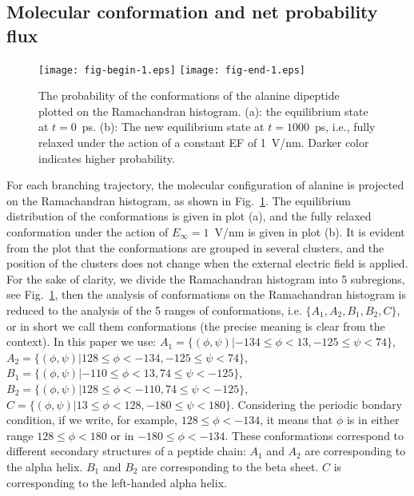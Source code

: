 \documentclass[a4paper,preprint,unsortedaddress,onecolumn]{revtex4-1}
\begin{document}
\subsection{Molecular conformation and net probability flux}

\begin{figure}
  \centering
  \texttt{[image: fig-begin-1.eps]}
  \texttt{[image: fig-end-1.eps]}
  \caption{The probability of the conformations of the alanine dipeptide plotted on the Ramachandran histogram.
    (a): the
    equilibrium state at $t=0$~\textsf{ps}. (b): The new equilibrium
    state at $t=1000$~\textsf{ps}, i.e., fully relaxed under the
    action of a constant EF of 1~V/nm.  Darker color
    indicates higher probability.}
  \label{fig:tmp4}
\end{figure}


For each branching trajectory,  the molecular configuration of alanine is projected on
the Ramachandran histogram, as
shown in Fig.~\ref{fig:tmp4}. The equilibrium distribution of the
conformations is given in plot (a), and the fully relaxed
conformation under the action of $E_{\infty} = 1$~V/nm is given in plot (b).  It is
evident from the plot that the conformations are grouped in several clusters, and the
position of the clusters does not change when the external electric
field is applied.
For the sake of clarity, we divide the
Ramachandran histogram into 5 subregions, see Fig.~\ref{fig:tmp4},
then the analysis of conformations on the Ramachandran histogram is reduced to the
analysis of the 5 ranges of conformations, i.e. $\{A_1, A_2, B_1, B_2, C\}$,
or in short we call them conformations (the precise meaning is clear
from the context).
In this paper we use:
$A_1 = \{(\phi, \psi) | -134 \leq \phi <  13, -125 \leq \psi < 74\}$,
$A_2 = \{(\phi, \psi) |  128 \leq \phi <-134, -125 \leq \psi < 74\}$,
$B_1 = \{(\phi, \psi) | -110 \leq \phi <  13,   74 \leq \psi <-125\}$,
$B_2 = \{(\phi, \psi) |  128 \leq \phi <-110,   74 \leq \psi <-125\}$,
$C   = \{(\phi, \psi) |   13 \leq \phi < 128, -180 \leq \psi < 180\}$.
Considering the periodic bondary condition, if we write, for example,
$128 \leq \phi <-134$, it means that $\phi$ is in either range
$128 \leq \phi < 180$ or in $-180 \leq \phi < -134$.
These conformations
correspond to different secondary structures of a peptide chain:
$A_1$ and $A_2$ are
corresponding to the alpha helix. $B_1$ and $B_2$ are
corresponding to the beta sheet. $C$ is corresponding to the
left-handed alpha helix.
\end{document}
